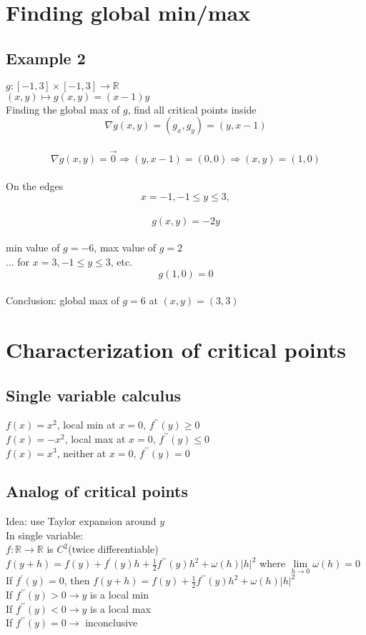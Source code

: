 \documentclass[12pt]{article}
\newcommand{\BR}{\mathbb R}
\newcommand{\doubleprime}{^{\prime\prime}}
\begin{document}
\section{Finding global min/max}
  \subsection{Example 2}
    $g: [-1,3]\times[-1,3]\rightarrow \BR$\\
    $(x,y)\mapsto g(x,y)=(x-1)y$\\
    Finding the global max of $g$, find all critical points inside\\
    \[\nabla g(x,y)=(g_x,g_y)=(y, x-1)\]\\
    \[\nabla g(x,y)=\vec{0}\Rightarrow (y,x-1)=(0,0) \Rightarrow(x,y)=(1,0)\]\\
    On the edges\\
    \[x=-1, -1\leq y\leq 3,\]\\
    \[g(x,y)=-2y\]\\
    min value of $g=-6$, max value of $g=2$\\
    ... for $x=3, -1\leq y \leq 3$, etc.\\
    \[g(1,0) = 0\]\\
    Conclusion: global max of $g=6$ at $(x,y)=(3,3)$
\section{Characterization of critical points}
  \subsection{Single variable calculus}
    $f(x)=x^2$, local min at $x=0$, $f\doubleprime(y)\geq 0$\\
    $f(x)=-x^2$, local max at $x=0$, $f\doubleprime(y)\leq 0$\\
    $f(x)=x^3$, neither at $x=0$, $f\doubleprime(y)=0$\\
  \subsection{Analog of critical points}
    Idea: use Taylor expansion around $y$\\
    In single variable:\\
    $f:\BR\rightarrow\BR$ is $C^2$(twice differentiable)\\
    $f(y+h)=f(y)+f^\prime(y)h+\frac{1}{2}f\doubleprime(y)h^2+\omega(h)|h|^2$ where $\lim\limits_{h\to0}\omega(h)=0$\\
    If $f^\prime(y)=0$, then $f(y+h)=f(y)+\frac{1}{2}f\doubleprime(y)h^2+\omega(h)|h|^2$\\
    If $f\doubleprime(y)>0\rightarrow y$ is a local min\\
    If $f\doubleprime(y)<0\rightarrow y$ is a local max\\
    If $f\doubleprime(y)=0\rightarrow$ inconclusive
\end{document}
